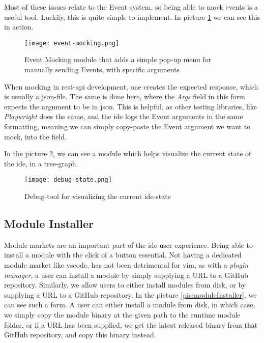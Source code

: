 Most of these issues relate to the Event system, so being able to mock events
is a useful tool. Luckily, this is quite simple to implement. In
picture \ref{pic:eventMock} we can see this in action.

\begin{figure}[H]
  \centering
  \texttt{[image: event-mocking.png]}
  \caption{
    Event Mocking module that adds a simple pop-up menu for manually sending
    Events, with specific arguments
  }
  \label{pic:eventMock}
\end{figure}

When mocking in \gls{rest}-\gls{api} development, one creates the expected
response, which is usually a \gls{json}-file. The same is done here, where the
\textit{Args} field in this form expects the argument to be in \gls{json}. This
is helpful, as other testing libraries, like \textit{Playwright} does the same,
and the \gls{ide} logs the Event arguments in the same formatting, meaning we
can simply copy-paste the Event argument we want to mock, into the field.

In the picture \ref{pic:debugState}, we can see a module which helps visualize
the current state of the \gls{ide}, in a tree-graph.

\begin{figure}[H]
  \centering
  \texttt{[image: debug-state.png]}
  \caption{
    Debug-tool for visualizing the current \gls{ide}-state
  }
  \label{pic:debugState}
\end{figure}

\subsection{Module Installer}

Module markets are an important part of the \gls{ide} user experience. Being
able to install a module with the click of a button essential. Not having a
dedicated module market like \gls{vscode}, has not been detrimental for
\gls{vim}, as with a \textit{plugin manager}, a user can install a module by
simply supplying a URL to a GitHub repository. Similarly, we allow users to
either install modules from disk, or by supplying a URL to a GitHub repository.
In the picture \ref{pic:moduleInstaller}, we can see such a form. A user can
either install a module from disk, in which case, we simply copy the module
binary at the given path to the runtime module folder, or if a URL has been
supplied, we get the latest released binary from that GitHub repository, and
copy this binary instead.

